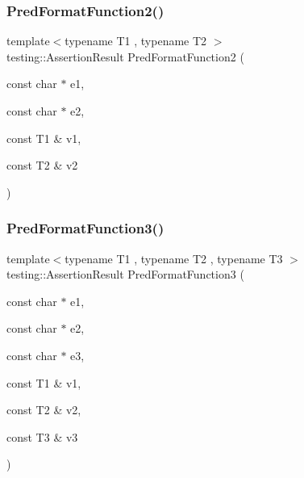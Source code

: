 \subsubsection{\texorpdfstring{PredFormatFunction2()}{PredFormatFunction2()}}
{\footnotesize\ttfamily template$<$typename T1 , typename T2 $>$ \\
testing\+::\+Assertion\+Result Pred\+Format\+Function2 (\begin{DoxyParamCaption}\item[{const char $\ast$}]{e1,  }\item[{const char $\ast$}]{e2,  }\item[{const T1 \&}]{v1,  }\item[{const T2 \&}]{v2 }\end{DoxyParamCaption})}

\mbox{\label{googletest-master_2googletest_2test_2gtest__pred__impl__unittest_8cc_abddc62e1faf4d19992a0acb69577e0f3}} 
\subsubsection{\texorpdfstring{PredFormatFunction3()}{PredFormatFunction3()}}
{\footnotesize\ttfamily template$<$typename T1 , typename T2 , typename T3 $>$ \\
testing\+::\+Assertion\+Result Pred\+Format\+Function3 (\begin{DoxyParamCaption}\item[{const char $\ast$}]{e1,  }\item[{const char $\ast$}]{e2,  }\item[{const char $\ast$}]{e3,  }\item[{const T1 \&}]{v1,  }\item[{const T2 \&}]{v2,  }\item[{const T3 \&}]{v3 }\end{DoxyParamCaption})}

\mbox{\label{googletest-master_2googletest_2test_2gtest__pred__impl__unittest_8cc_a9fbd4c3333dcc98c0cfee19ce28bc2b1}} 
